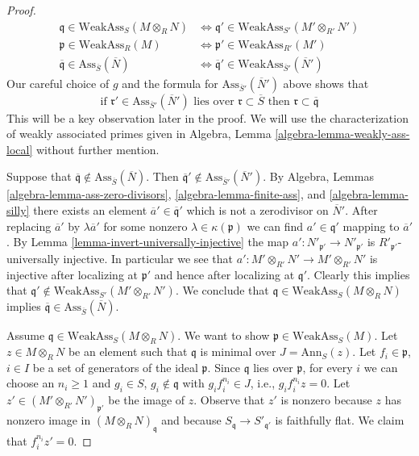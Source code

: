 \begin{proof}
\begin{align*}
\mathfrak q \in \text{WeakAss}_S(M \otimes_R N)
& \Leftrightarrow
\mathfrak q' \in \text{WeakAss}_{S'}(M' \otimes_{R'} N') \\
\mathfrak p \in \text{WeakAss}_R(M)
& \Leftrightarrow
\mathfrak p' \in \text{WeakAss}_{R'}(M') \\
\overline{\mathfrak q} \in \text{Ass}_{\overline{S}}(\overline{N})
& \Leftrightarrow
\overline{\mathfrak q}' \in \text{WeakAss}_{\overline{S}'}(\overline{N}')
\end{align*}
Our careful choice of $g$ and the formula for
$\text{Ass}_{\overline{S}'}(\overline{N}')$ above shows that
\begin{equation}
\label{equation-key-observation}
\text{if }\mathfrak r' \in \text{Ass}_{\overline{S}'}(\overline{N}')
\text{ lies over }\mathfrak r \subset \overline{S}\text{ then }
\mathfrak r \subset \overline{\mathfrak q}
\end{equation}
This will be a key observation later in the proof. We will use
the characterization of weakly associated primes given in
Algebra, Lemma \ref{algebra-lemma-weakly-ass-local} without further mention.

\medskip\noindent
Suppose that
$\overline{\mathfrak q} \not \in \text{Ass}_{\overline{S}}(\overline{N})$.
Then
$\overline{\mathfrak q}' \not \in \text{Ass}_{\overline{S}'}(\overline{N}')$.
By
Algebra, Lemmas \ref{algebra-lemma-ass-zero-divisors},
\ref{algebra-lemma-finite-ass}, and
\ref{algebra-lemma-silly}
there exists an element $\overline{a}' \in \overline{\mathfrak q}'$
which is not a zerodivisor on $\overline{N}'$.
After replacing $\overline{a}'$ by $\lambda \overline{a}'$ for some nonzero
$\lambda \in \kappa(\mathfrak p)$ we can find
$a' \in \mathfrak q'$ mapping to $\overline{a}'$. By
Lemma \ref{lemma-invert-universally-injective}
the map $a' : N'_{\mathfrak p'} \to N'_{\mathfrak p'}$ is
$R'_{\mathfrak p'}$-universally injective. In particular
we see that $a' : M' \otimes_{R'} N' \to M' \otimes_{R'} N'$ is
injective after localizing at $\mathfrak p'$ and hence after
localizing at $\mathfrak q'$. Clearly this implies that
$\mathfrak q' \not \in \text{WeakAss}_{S'}(M' \otimes_{R'} N')$.
We conclude that $\mathfrak q \in \text{WeakAss}_S(M \otimes_R N)$ implies
$\overline{\mathfrak q} \in \text{Ass}_{\overline{S}}(\overline{N})$.

\medskip\noindent
Assume $\mathfrak q \in \text{WeakAss}_S(M \otimes_R N)$. We want
to show $\mathfrak p \in \text{WeakAss}_S(M)$.
Let $z \in M \otimes_R N$ be an element such that $\mathfrak q$
is minimal over $J = \text{Ann}_S(z)$.
Let $f_i \in \mathfrak p$, $i \in I$ be a set of generators of the
ideal $\mathfrak p$. Since $\mathfrak q$ lies over $\mathfrak p$, for every $i$
we can choose an $n_i \geq 1$ and $g_i \in S$, $g_i \not \in \mathfrak q$
with $g_i f_i^{n_i} \in J$, i.e., $g_i f_i^{n_i} z = 0$.
Let $z' \in (M' \otimes_{R'} N')_{\mathfrak p'}$ be the image of $z$.
Observe that $z'$ is nonzero because $z$ has nonzero image in
$(M \otimes_R N)_\mathfrak q$ and because $S_\mathfrak q \to S'_{\mathfrak q'}$
is faithfully flat. We claim that $f_i^{n_i} z' = 0$.


\end{proof}
